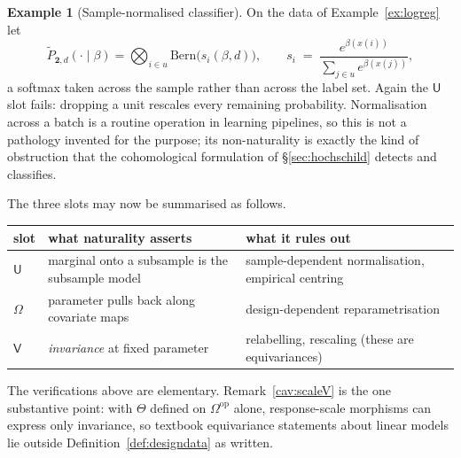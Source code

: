 \documentclass[11pt,a4paper]{article}
\theoremstyle{plain}
\theoremstyle{definition}
\newtheorem{example}[theorem]{Example}
\theoremstyle{remark}
\newcommand{\cat}[1]{\mathsf{#1}}
\newcommand{\catU}{\cat{U}}
\newcommand{\catV}{\cat{V}}
\newcommand{\catO}{\cat{\Omega}}
\newcommand{\op}{\mathrm{op}}
\newcommand{\Bern}{\mathrm{Bern}}
\begin{document}
\begin{example}[Sample-normalised classifier]\label{ex:softmax}
On the data of Example~\ref{ex:logreg} let
\[
\widetilde{P}_{\mathbf{2},d}(\cdot\mid\beta)
= \bigotimes_{i\in u}\Bern\bigl(s_{i}(\beta,d)\bigr),
\qquad
s_{i} \;=\; \frac{e^{\beta(x(i))}}{\sum_{j\in u}e^{\beta(x(j))}},
\]
a softmax taken
across the sample rather than across the label set. Again the $\catU$ slot
fails: dropping a unit rescales every remaining probability. Normalisation
across a batch is a routine operation in learning pipelines, so this is not a
pathology invented for the purpose; its non-naturality is exactly the kind of
obstruction that the cohomological formulation of \S\ref{sec:hochschild}
detects and classifies.
\end{example}

\medskip
\noindent The three slots may now be summarised as follows.

\begin{center}
\small
\begin{tabular}{@{}lll@{}}
\toprule
slot & what naturality asserts & what it rules out \\
\midrule
$\catU$ & marginal onto a subsample is the subsample model
        & sample-dependent normalisation, empirical centring \\
$\catO$ & parameter pulls back along covariate maps
        & design-dependent reparametrisation \\
$\catV$ & \emph{invariance} at fixed parameter
        & relabelling, rescaling (these are equivariances) \\
\bottomrule
\end{tabular}
\end{center}

The verifications above are elementary. Remark~\ref{cav:scaleV} is the one
substantive point: with $\Theta$ defined on $\catO^{\op}$ alone,
response-scale morphisms can express only invariance, so textbook equivariance
statements about linear models lie outside Definition~\ref{def:designdata} as
written.
\end{document}
